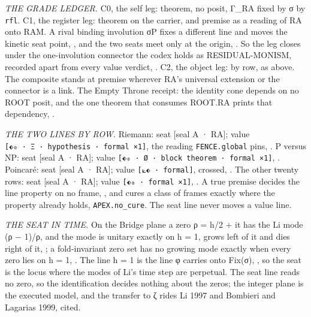 \documentclass[10pt,twocolumn]{article}
\begin{document}
\emph{THE GRADE LEDGER.} C0, the self leg: theorem, no posit, Γ\_RA
fixed by σ by \texttt{rfl}. C1, the register leg: theorem on the
carrier, and premise as a reading of RA onto RAM. A rival binding
involution σP fixes a different line and moves the kinetic seat point,
\texttt{}, and the
two seats meet only at the origin,
\texttt{}. So the leg closes
under the one-involution connector the codex holds as RESIDUAL-MONISM,
recorded apart from every value verdict,
\texttt{}. C2, the object
leg: by row, as above. The composite stands at premise wherever RA's
universal extension or the connector is a link. The Empty Throne
receipt: the identity cone depends on no ROOT posit, and the one theorem
that consumes ROOT.RA prints that dependency,
\texttt{}.

\emph{THE TWO LINES BY ROW.} Riemann: seat {[}seal A · RA{]}; value
\texttt{{[}⬖₀\ ·\ Ξ\ ·\ hypothesis\ ·\ formal\ ×1{]}}, the reading
\texttt{FENCE.global} pins,
\texttt{}. P versus NP:
seat {[}seal A · RA{]}; value
\texttt{{[}⬖₀\ ·\ Ø\ ·\ block\ theorem\ ·\ formal\ ×1{]}},
\texttt{}. Poincaré: seat {[}seal A ·
RA{]}; value \texttt{{[}⟀⬖\ ·\ formal{]}}, crossed,
\texttt{}. The other twenty rows:
seat {[}seal A · RA{]}; value \texttt{{[}⬖₀\ ·\ formal\ ×1{]}},
\texttt{}. A true premise decides
the line property on no frame,
\texttt{}, and cures a class
of frames exactly where the property already holds,
\texttt{APEX.no\_cure}. The seat line never moves a value line.

\emph{THE SEAT IN TIME.} On the Bridge plane a zero ρ = h/2 + it has the
Li mode (ρ − 1)/ρ, and the mode is unitary exactly on h = 1, grows left
of it and dies right of it,
\texttt{}; a fold-invariant zero
set has no growing mode exactly when every zero lies on h = 1,
\texttt{}. The line h = 1 is the
line φ carries onto Fix(σ),
\texttt{}, so the seat is the locus
where the modes of Li's time step are perpetual. The seat line reads no
zero, so the identification decides nothing about the zeros; the integer
plane is the executed model, and the transfer to ζ rides Li 1997 and
Bombieri and Lagarias 1999, cited.
\end{document}
